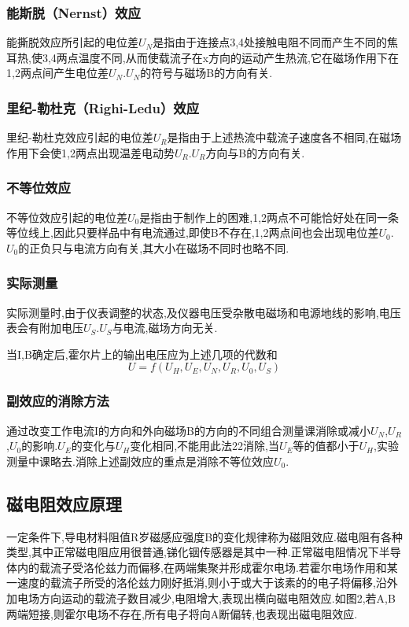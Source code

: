 \documentclass{thuemp}
\begin{document}
\subsubsection{能斯脱（Nernst）效应}
能撕脱效应所引起的电位差$U_{N}$是指由于连接点3,4处接触电阻不同而产生不同的焦耳热,使3,4两点温度不同,从而使载流子在x方向的运动产生热流,它在磁场作用下在1,2两点间产生电位差$U_{N}$.$U_{N}$的符号与磁场B的方向有关.
\subsubsection{里纪-勒杜克（Righi-Ledu）效应}
里纪-勒杜克效应引起的电位差$U_{R}$是指由于上述热流中载流子速度各不相同,在磁场作用下会使1,2两点出现温差电动势$U_{R}$.$U_{R}$方向与B的方向有关.
\subsubsection{不等位效应}
不等位效应引起的电位差$U_0$是指由于制作上的困难,1,2两点不可能恰好处在同一条等位线上,因此只要样品中有电流通过,即使B不存在,1,2两点间也会出现电位差$U_0$.$U_0$的正负只与电流方向有关,其大小在磁场不同时也略不同.
\subsubsection{实际测量}
实际测量时,由于仪表调整的状态,及仪器电压受杂散电磁场和电源地线的影响,电压表会有附加电压$U_{S}$.$U_{S}$与电流,磁场方向无关.


当I,B确定后,霍尔片上的输出电压应为上述几项的代数和
\[U=f(U_{H},U_{E},U_{N},U_{R},U_{0},U_{S})\]
\subsubsection{副效应的消除方法}
通过改变工作电流I的方向和外向磁场B的方向的不同组合测量课消除或减小$U_{N}$,$U_{R}$,$U_0$的影响.$U_{E}$的变化与$U_{H}$变化相同,不能用此法22消除,当$U_{E}$等的值都小于$U_{H}$,实验测量中课略去.消除上述副效应的重点是消除不等位效应$U_{0}$.
\subsection{磁电阻效应原理}
一定条件下,导电材料阻值R岁磁感应强度B的变化规律称为磁阻效应.磁电阻有各种类型,其中正常磁电阻应用很普通,锑化铟传感器是其中一种.正常磁电阻情况下半导体内的载流子受洛伦兹力而偏移,在两端集聚并形成霍尔电场.若霍尔电场作用和某一速度的载流子所受的洛伦兹力刚好抵消,则小于或大于该素的的电子将偏移,沿外加电场方向运动的载流子数目减少,电阻增大,表现出横向磁电阻效应.如图2,若A,B两端短接,则霍尔电场不存在,所有电子将向A断偏转,也表现出磁电阻效应.
\end{document}
